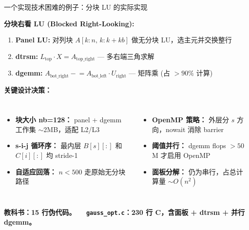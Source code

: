 \documentclass[12pt,aspectratio=169]{beamer}
\begin{document}
\begin{frame}[shrink]{一个实现技术困难的例子：分块 LU 的实际实现}

\textbf{分块右看 LU (Blocked Right-Looking):}

\small
\begin{enumerate}
  \item \textbf{Panel LU:} 对列块 $A[k:n,\,k:k+kb]$ 做无分块 LU，选主元并交换整行
  \item \textbf{dtrsm:} $L_{\text{top}}\cdot X = A_{\text{top\_right}}$ — 多右端三角求解
  \item \textbf{dgemm:} $A_{\text{bot\_right}} \mathrel{-}= A_{\text{bot\_left}}\cdot U_{\text{right}}$ — 矩阵乘 (占 $>90\%$ 计算)
\end{enumerate}

\vspace{6pt}
\textbf{关键设计决策：}

\begin{columns}[T]
\begin{itemize}
  \item \textbf{块大小 nb=128：} panel + dgemm 工作集 $\sim$2MB，适配 L2/L3
  \item \textbf{s-i-j 循环序：} 最内层 $B[s][:]$ 和 $C[i][:]$ 均 stride-1
  \item \textbf{自适应回落：} $n<500$ 走原始无分块路径
\end{itemize}

\begin{itemize}
  \item \textbf{OpenMP 策略：} 外层分 $s$ 方向，nowait 消除 barrier
  \item \textbf{阈值并行：} dgemm flops $>50$M 才启用 OpenMP
  \item \textbf{面板分解：} 仍为串行，占总计算量 $\sim O(n^2)$
\end{itemize}
\end{columns}

\vspace{6pt}
\begin{center}
\footnotesize
\textbf{教科书：15 行伪代码。~~ \texttt{gauss\_opt.c}：230 行 C，含面板 + dtrsm + 并行 dgemm。}
\end{center}
\end{frame}
\end{document}
